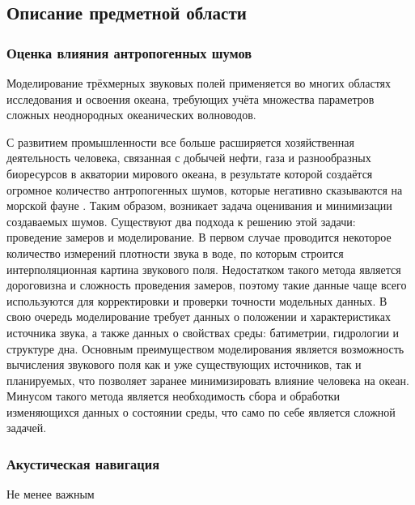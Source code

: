 \documentclass[../document.tex]{subfiles}
\begin{document}
    \subsection{Описание предметной области}
    \subsubsection{Оценка влияния антропогенных шумов}
        \par Моделирование трёхмерных звуковых полей применяется во многих областях исследования и освоения океана, требующих учёта множества параметров сложных неоднородных океанических волноводов.
        \par С развитием промышленности все больше расширяется хозяйственная деятельность человека, связанная с добычей нефти, газа и разнообразных биоресурсов в акватории мирового океана, в результате которой создаётся огромное количество антропогенных шумов, которые негативно сказываются на морской фауне \cite{noise1, noise2}. Таким образом, возникает задача оценивания и минимизации создаваемых шумов. Существуют два подхода к решению этой задачи: проведение замеров и моделирование. В первом случае проводится некоторое количество измерений плотности звука в воде, по которым строится интерполяционная картина звукового поля. Недостатком такого метода является дороговизна и сложность проведения замеров, поэтому такие данные чаще всего используются для корректировки и проверки точности модельных данных. В свою очередь моделирование требует данных о положении и характеристиках источника звука, а также данных о свойствах среды: батиметрии, гидрологии и структуре дна. Основным преимуществом моделирования является возможность вычисления звукового поля как и уже существующих источников, так и планируемых, что позволяет заранее минимизировать влияние человека на океан. Минусом такого метода является необходимость сбора и обработки изменяющихся данных о состоянии среды, что само по себе является сложной задачей.
    \subsubsection{Акустическая навигация}
        \par Не менее важным 
\end{document}
